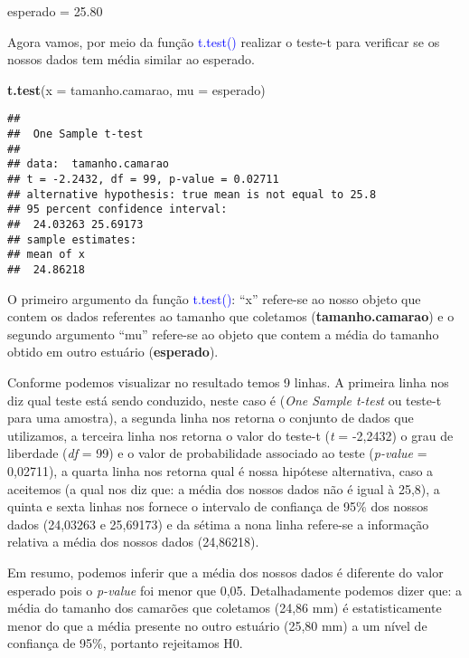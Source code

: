 \documentclass[14pt,titlepage, oneside, openany, a4paper]{book}
\newenvironment{Shaded}{\begin{snugshade}}{\end{snugshade}}
\newcommand{\DataTypeTok}[1]{\textcolor[rgb]{0.13,0.29,0.53}{#1}}
\newcommand{\FloatTok}[1]{\textcolor[rgb]{0.00,0.00,0.81}{#1}}
\newcommand{\KeywordTok}[1]{\textcolor[rgb]{0.13,0.29,0.53}{\textbf{#1}}}
\newcommand{\NormalTok}[1]{#1}
\newcommand{\StringTok}[1]{\textcolor[rgb]{0.31,0.60,0.02}{#1}}
\begin{document}
\begin{Shaded}
\begin{Highlighting}[]
\NormalTok{esperado =}\StringTok{ }\FloatTok{25.80}
\end{Highlighting}
\end{Shaded}

Agora vamos, por meio da função \textcolor{blue}{t.test()} realizar o teste-t para verificar se os nossos dados tem média similar ao esperado.

\begin{Shaded}
\begin{Highlighting}[]
\KeywordTok{t.test}\NormalTok{(}\DataTypeTok{x =}\NormalTok{ tamanho.camarao, }\DataTypeTok{mu =}\NormalTok{ esperado)}
\end{Highlighting}
\end{Shaded}

\begin{verbatim}
## 
##  One Sample t-test
## 
## data:  tamanho.camarao
## t = -2.2432, df = 99, p-value = 0.02711
## alternative hypothesis: true mean is not equal to 25.8
## 95 percent confidence interval:
##  24.03263 25.69173
## sample estimates:
## mean of x 
##  24.86218
\end{verbatim}

O primeiro argumento da função \textcolor{blue}{t.test()}: ``x'' refere-se ao nosso objeto que contem os dados referentes ao tamanho que coletamos (\textbf{tamanho.camarao}) e o segundo argumento ``mu'' refere-se ao objeto que contem a média do tamanho obtido em outro estuário (\textbf{esperado}).

Conforme podemos visualizar no resultado temos 9 linhas. A primeira linha nos diz qual teste está sendo conduzido, neste caso é (\emph{One Sample t-test} ou teste-t para uma amostra), a segunda linha nos retorna o conjunto de dados que utilizamos, a terceira linha nos retorna o valor do teste-t (\emph{t} = -2,2432) o grau de liberdade (\emph{df} = 99) e o valor de probabilidade associado ao teste (\emph{p-value} = 0,02711), a quarta linha nos retorna qual é nossa hipótese alternativa, caso a aceitemos (a qual nos diz que: a média dos nossos dados não é igual à 25,8), a quinta e sexta linhas nos fornece o intervalo de confiança de 95\% dos nossos dados (24,03263 e 25,69173) e da sétima a nona linha refere-se a informação relativa a média dos nossos dados (24,86218).

Em resumo, podemos inferir que a média dos nossos dados é diferente do valor esperado pois o \emph{p-value} foi menor que 0,05. Detalhadamente podemos dizer que: a média do tamanho dos camarões que coletamos (24,86 mm) é estatisticamente menor do que a média presente no outro estuário (25,80 mm) a um nível de confiança de 95\%, portanto rejeitamos H0.
\end{document}
